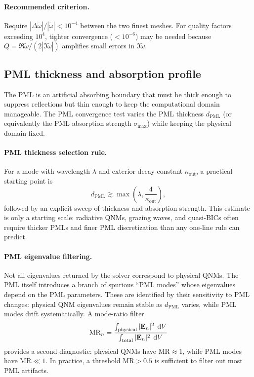 \paragraph{Recommended criterion.}
Require $|\Delta\tilde{\omega}| / |\tilde{\omega}| < 10^{-4}$ between
the two finest meshes. For quality factors exceeding $10^4$, tighter
convergence ($< 10^{-6}$) may be needed because $Q = \Re\tilde{\omega}
/(2|\Im\tilde{\omega}|)$ amplifies small errors in
$\Im\tilde{\omega}$.

\subsection{PML thickness and absorption profile}
\label{ssec:pml-convergence}

The PML is an artificial absorbing boundary that must be thick enough
to suppress reflections but thin enough to keep the computational
domain manageable. The PML convergence test varies the PML thickness
$d_{\mathrm{PML}}$ (or equivalently the PML absorption strength
$\sigma_{\max}$) while keeping the physical domain fixed.

\paragraph{PML thickness selection rule.}
For a mode with wavelength $\lambda$ and exterior decay constant
$\kappa_{\mathrm{out}}$, a practical starting point is
\begin{equation}
 d_{\mathrm{PML}} \gtrsim
 \max\left(\lambda,\frac{4}{\kappa_{\mathrm{out}}}\right),
 \label{eq:pml-thickness-rule}
\end{equation}
followed by an explicit sweep of thickness and absorption strength.
This estimate is only a starting scale: radiative QNMs, grazing waves,
and quasi-BICs often require thicker PMLs and finer PML discretization
than any one-line rule can predict.

\paragraph{PML eigenvalue filtering.}
Not all eigenvalues returned by the solver correspond to physical QNMs.
The PML itself introduces a branch of spurious ``PML modes'' whose
eigenvalues depend on the PML parameters. These are identified by
their sensitivity to PML changes: physical QNM eigenvalues remain
stable as $d_{\mathrm{PML}}$ varies, while PML modes drift
systematically. A mode-ratio filter
\begin{equation}
 \mathrm{MR}_n = \frac{\int_{\mathrm{physical}} |\mathbf{E}_n|^2\;\mathop{}\!\mathrm{d} V}
 {\int_{\mathrm{total}} |\mathbf{E}_n|^2\;\mathop{}\!\mathrm{d} V}
 \label{eq:mode-ratio-filter}
\end{equation}
provides a second diagnostic: physical QNMs have $\mathrm{MR} \approx 1$,
while PML modes have $\mathrm{MR} \ll 1$. In practice, a threshold
$\mathrm{MR} > 0.5$ is sufficient to filter out most PML artifacts.

